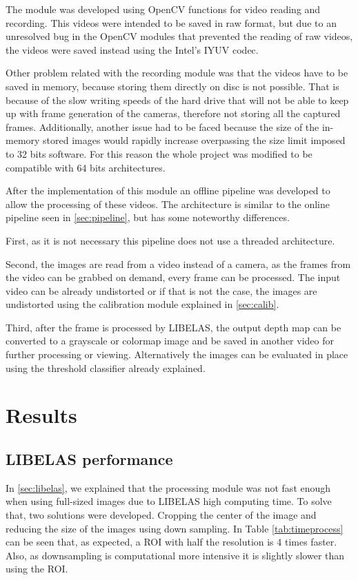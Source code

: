 \documentclass[10pt,a4paper,twocolumn,twoside]{article}
\begin{document}
	The module was developed using OpenCV functions for video reading and recording. This videos were intended to be saved in raw format, but due to an unresolved bug in the OpenCV modules that prevented the reading of raw videos, the videos were saved instead using the Intel's IYUV codec. %
	
	Other problem related with the recording module was that the videos have to be saved in memory, because storing them directly on disc is not possible. That is because of the slow writing speeds of the hard drive that will not be able to keep up with frame generation of the cameras, therefore not storing all the captured frames. Additionally, another issue had to be faced because the size of the in-memory stored images would rapidly increase overpassing the size limit imposed to 32 bits software. For this reason the whole project was modified to be compatible with 64 bits architectures.
	
	After the implementation of this module an offline pipeline was developed to allow the processing of these videos. The architecture is similar to the online pipeline seen in \ref{sec:pipeline}, but has some noteworthy differences.  
	
	First, as it is not necessary this pipeline does not use a threaded architecture.
	
	Second, the images are read from a video instead of a camera, as the frames from the video can be grabbed on demand, every frame can be processed. The input video can be already undistorted or if that is not the case, the images are undistorted using the calibration module explained in \ref{sec:calib}. 
	
	Third, after the frame is processed by LIBELAS, the output depth map can be converted to a grayscale or colormap image and be saved in another video for further processing or viewing. Alternatively the images can be evaluated in place using the threshold classifier already explained.  

	
	\section{Results}
	
	\subsection{LIBELAS performance}
	\label{sec:resizeperformance}
	In \ref{sec:libelas}, we explained that the processing module was not fast enough when using full-sized images due to LIBELAS high computing time. To solve that, two solutions were developed. Cropping the center of the image and reducing the size of the images using down sampling. In Table \ref{tab:timeprocess} can be seen that, as expected, a ROI with half the resolution is 4 times faster. Also, as downsampling is computational more intensive it is slightly slower than using the ROI.  
	
\end{document}
